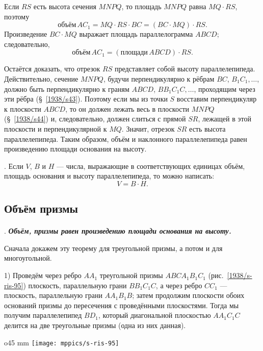 Если $RS$ есть высота сечения $MNPQ$, то площадь $MNPQ$ равна $MQ\cdot RS$, поэтому
\[\text{объём}\, AC_1 = MQ\cdot RS\cdot BC = (BC\cdot MQ)\cdot RS.\]
Произведение $BC\cdot MQ$ выражает площадь параллелограмма $ABCD$;
следовательно, 
\[\text{объём}\, AC_1 =(\text{площади}\, ABCD) \cdot RS.\]

Остаётся доказать, что отрезок $RS$ представляет собой высоту параллелепипеда.
Действительно, сечение $MNPQ$, будучи перпендикулярно к рёбрам $BC$, $B_1C_1,\dots$, должно быть перпендикулярно к граням $ABCD$, $BB_1C_1C,\dots$, проходящим через эти рёбра (§~\ref{1938/s43}).
Поэтому если мы из точки $S$ восставим перпендикуляр к плоскости $ABCD$, то он должен лежать весь в плоскости $MNPQ$ (§~\ref{1938/s44}) и, следовательно, должен слиться с прямой $SR$, лежащей в этой плоскости и перпендикулярной к $MQ$.
Значит, отрезок $SR$ есть высота параллелепипеда.
Таким образом, объём и наклонного параллелепипеда равен произведению площади основания на высоту.

\medskip

.
Если $V$, $B$ и $H$ — числа, выражающие в соответствующих единицах объём, площадь основания и высоту параллелепипеда, то можно написать:
\[V = B\cdot H.\]

\subsection*{Объём призмы}

\paragraph{}\label{1938/s88}
.
\textbf{\emph{Объём, призмы равен произведению площади основания на высоту.}}

Сначала докажем эту теорему для треугольной призмы, а потом и для многоугольной.

{\sloppy

1) Проведём через ребро $AA_1$ треугольной призмы $ABCA_1B_1C_1$ (рис.~\ref{1938/s-ris-95}) плоскость, параллельную грани $BB_1C_1C$, а через ребро $CC_1$ — плоскость, параллельную грани $AA_1B_1B$;
затем продолжим плоскости обоих оснований призмы до пересечения с проведёнными плоскостями.
Тогда мы получим параллелепипед $BD_1$, который диагональной плоскостью $AA_1C_1C$ делится на две треугольные призмы (одна из них данная).

}

\begin{wrapfigure}{o}{45 mm}
\vskip-4mm
\centering
\texttt{[image: mppics/s-ris-95]}
\caption{}\label{1938/s-ris-95}
\vskip-0mm
\end{wrapfigure}

